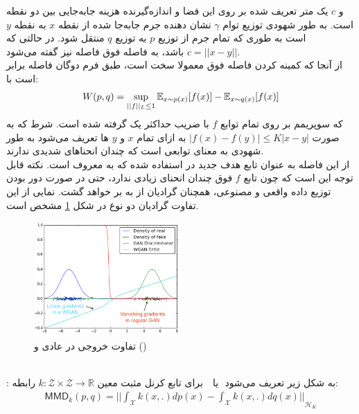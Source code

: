 و $c$ یک متر تعریف شده بر روی این فضا و اندازه‌گیرنده هزینه جابه‌جایی بین دو نقطه است. به طور شهودی توزیع توام $\gamma$ نشان دهنده جرم جابه‌جا شده از نقطه $x$ به نقطه $y$ است به طوری که تمام جرم از توزیع $p$ به توزیع $q$ منتقل شود. در حالتی که $c = ||x-y||$ باشد، به فاصله فوق فاصله \earthmover{} نیز گفته می‌شود.
\\
از آنجا که کمینه کردن فاصله فوق معمولا سخت است، طبق فرم دوگان  فاصله \earthmover{} برابر است با:
\begin{align}
	W(p, q) = \sup_{||f||_L \leq 1} \mathbb E_{x \sim p(x)}[f(x)] - \mathbb E_{x \sim q(x)}[f(x)]
\end{align}
که سوپریمم بر روی تمام توابع $f$ با ضریب \lipschitz{} حداکثر یک گرفته شده است. شرط \lipschitz[K-]{} که به صورت
$|f(x) - f(y)| \leq K |x - y|$
به ازای تمام $x$ و $y$ ها تعریف می‌شود به طور شهودی به معنای توابعی است که چندان انحنا‌های شدیدی ندارند.
\\
از این فاصله به عنوان تابع هدف جدید در \gan{} استفاده شده که به \wgan{} معروف است. نکته قابل توجه این است که چون تابع $f$ فوق چندان انحنای زیادی ندارد، حتی در صورت دور بودن توزیع داده واقعی و مصنوعی، همچنان گرادیان از \discriminator{} به \generator{} بر خواهد گشت. نمایی از این تفاوت گرادیان دو نوع  \gan{} در شکل \ref{fig:chap2:wgan1} مشخص است.
\begin{figure}[h]
	\centering
	\includegraphics[width=0.5\textwidth]{images/wgan1.png}
	\caption{تفاوت خروجی \discriminator{}
		در \gan{} عادی و \wgan{} ()}
	\label{fig:chap2:wgan1}
\end{figure}
\\
:
برای تابع کرنل مثبت معین 
$k: ‎\mathcal{Z} ‎‎\times \mathcal{Z} ‎\rightarrow ‎\mathbb{R}‎‎$
رابطه ‎\mmd{} ‎ یا ‎ به شکل زیر تعریف می‌شود:
\begin{gather}
	\mathsf{MMD}_k(p, q) = {\vert \vert \int_\mathcal{X} k(x, .) dp(x) - \int_\mathcal{X} k(x, .) dq(x) \vert \vert}_{\mathcal{H}_K}
\end{gather}
